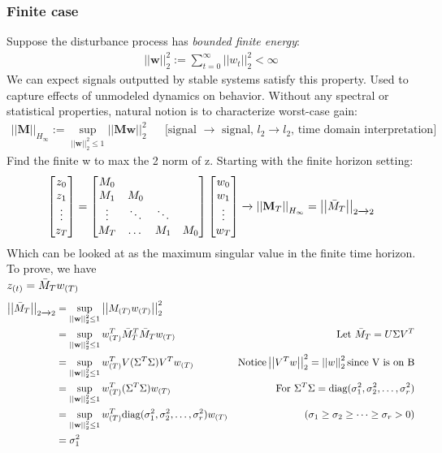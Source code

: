 \documentclass{article}[12pt]
\newcommand{\norm}[1]{\left|\left|#1\right|\right|}
\begin{document}
\subsubsection{Finite case}
    Suppose the disturbance process has \textit{bounded finite energy}:
    \begin{align*}
        \norm{\textbf{w}}^2_2 := \sum^{\infty}_{t=0}\norm{w_t}^2_2 < \infty
    \end{align*}
    We can expect signals outputted by stable systems satisfy this property. Used to capture effects of unmodeled dynamics on behavior. Without any spectral or statistical properties, natural notion is to characterize worst-case gain:
    \begin{align*}
        \norm{\textbf{M}}_{H_{\infty}} := \sup_{\norm{\textbf{w}}_2^2\leq1}\norm{\textbf{Mw}}_2^2 && \text{[signal $\xrightarrow{}$ signal, $l_2\xrightarrow{}l_2$, time domain interpretation]}
    \end{align*}
    Find the finite w to max the 2 norm of z. Starting with the finite horizon setting:
    \begin{align*}
        \begin{bmatrix}z_0\\z_1\\\vdots\\z_T\end{bmatrix} =  
        \begin{bmatrix}M_0\\M_1 & M_0\\ \vdots &\ddots&\ddots\\M_T&\dots&M_1&M_0 \end{bmatrix}\begin{bmatrix}w_0\\w_1\\\vdots\\w_T\end{bmatrix} \xrightarrow{} \norm{\textbf{M}_T}_{H_{\infty}} = \norm{\Bar{M}_T}_{2\xrightarrow{}2}
    \end{align*}
    Which can be looked at as the maximum singular value in the finite time horizon. To prove, we have\\
    $z_{(t)} = \Bar{M}_{T}w_{(T)}$
    \begin{align*}
        \norm{\Bar{M}_T}_{2\xrightarrow{}2} &= \sup_{\norm{\textbf{w}}_2^2\leq1}\norm{M_{(T)}w_{(T)}}^2_2\\
        &= \sup_{\norm{\textbf{w}}_2^2\leq1} w_{(T)}^T\Bar{M}_T^T\Bar{M}_T w_{(T)} &  \text{Let } \Bar{M}_T = U\Sigma V^T\\
        &=\sup_{\norm{\textbf{w}}_2^2\leq1}w_{(T)}^T V(\Sigma^T\Sigma)V^T w_{(T)} & \text{Notice} \norm{V^Tw}^2_2 = \norm{w}^2_2 \text{since V is on B}\\
         &=\sup_{\norm{\textbf{w}}_2^2\leq1}w_{(T)}^T (\Sigma^T\Sigma) w_{(T)} & \text{For } \Sigma^T\Sigma = \text{diag}(\sigma_1^2,\sigma_2^2,\dots,\sigma_r^2)\\
         &=\sup_{\norm{\textbf{w}}_2^2\leq1}w_{(T)}^T \text{diag}(\sigma_1^2,\sigma_2^2,\dots,\sigma_r^2) w_{(T)} & (\sigma_1\geq\sigma_2\geq\dots\geq\sigma_r>0)\\
         &= \sigma_1^2
    \end{align*}
\end{document}
